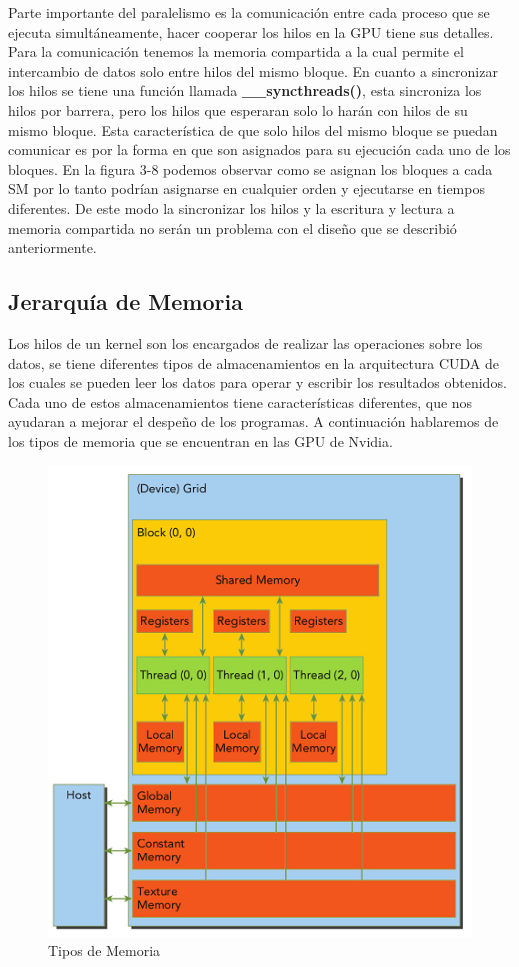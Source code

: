 \pagebreak
Parte importante del paralelismo es la comunicación entre cada proceso que se ejecuta simultáneamente, hacer cooperar los hilos en la GPU tiene sus detalles. Para la comunicación tenemos la memoria compartida a la cual permite el intercambio de datos solo entre hilos del mismo bloque. En cuanto a sincronizar los hilos se tiene una función llamada \textbf{\_\_syncthreads()}, esta sincroniza los hilos por barrera, pero los hilos que esperaran solo lo harán con hilos de su mismo bloque. Esta característica de que solo hilos del mismo bloque se puedan comunicar es por la forma en que son asignados para su ejecución cada uno de los bloques. En la figura 3-8 podemos observar como se asignan los bloques a cada SM por lo tanto podrían asignarse en cualquier orden y ejecutarse en tiempos diferentes. De este modo la sincronizar los hilos y la escritura y lectura a memoria compartida no serán un problema con el diseño que se describió anteriormente.




\subsection{Jerarquía de Memoria}


Los hilos de un kernel son los encargados de realizar las operaciones sobre los datos, se tiene diferentes tipos de almacenamientos en la arquitectura CUDA de los cuales se pueden leer los datos para operar y escribir los resultados obtenidos. Cada uno de estos almacenamientos tiene características diferentes, que nos ayudaran a mejorar el despeño de los programas. A continuación hablaremos de los tipos de memoria que se encuentran en las GPU de Nvidia.

\begin{figure}[h]
			\centering
				\includegraphics[scale=0.6]{img/memoria.jpg}
			\caption{Tipos de Memoria}
\end{figure}

